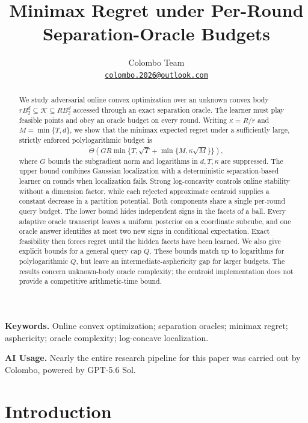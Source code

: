 \documentclass[11pt]{article}
\title{Minimax Regret under Per-Round\\Separation-Oracle Budgets}
\author{Colombo Team\\\normalsize\href{mailto:colombo.2026@outlook.com}{\texttt{colombo.2026@outlook.com}}}
\date{}
\newcommand{\K}{\mathcal K}
\newcommand{\wtTheta}{\widetilde\Theta}
\theoremstyle{definition}
\begin{document}
\maketitle

\begin{abstract}
We study adversarial online convex optimization over an unknown convex body
$rB_2^d\subseteq\K\subseteq RB_2^d$ accessed through an exact separation oracle.
The learner must play feasible points and obey an oracle budget on every round.
Writing $\kappa=R/r$ and $M=\min\{T,d\}$, we show that the minimax expected regret
under a sufficiently large, strictly enforced polylogarithmic budget is
\[
 \wtTheta\!\left(GR\min\{T,\sqrt T+\min\{M,\kappa\sqrt M\}\}\right),
\]
where $G$ bounds the subgradient norm and logarithms in $d,T,\kappa$ are
suppressed. The upper bound combines Gaussian localization with a deterministic
separation-based learner on rounds when localization fails. Strong
log-concavity controls online stability without a dimension factor, while each
rejected approximate centroid supplies a constant decrease in a partition
potential. Both components share a single per-round query budget. The lower
bound hides independent signs in the facets of a ball. Every adaptive oracle
transcript leaves a uniform posterior on a coordinate subcube, and one oracle
answer identifies at most two new signs in conditional expectation. Exact
feasibility then forces regret until the hidden facets have been learned.
We also give explicit bounds for a general query cap $Q$. These bounds match up
to logarithms for polylogarithmic $Q$, but leave an intermediate-asphericity gap
for larger budgets. The results concern unknown-body oracle complexity; the
centroid implementation does not provide a competitive arithmetic-time bound.
\end{abstract}

\noindent\textbf{Keywords.} Online convex optimization; separation oracles;
minimax regret; asphericity; oracle complexity; log-concave localization.

\medskip
\begin{samepage}
\noindent\textbf{AI Usage.}
Nearly the entire research pipeline for this paper was carried out by
Colombo, powered by GPT-5.6 Sol. 
\par
\end{samepage}

\section{Introduction}
\end{document}
